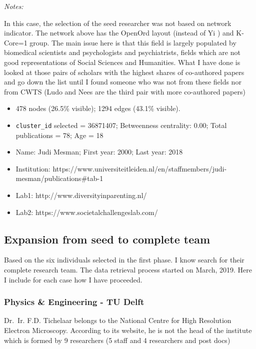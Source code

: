 \documentclass[]{elsarticle} %
\providecommand{\tightlist}{%
  \setlength{\itemsep}{0pt}\setlength{\parskip}{0pt}}
\begin{document}
\emph{Notes:}

In this case, the selection of the seed researcher was not based on
network indicator. The network above has the OpenOrd layout (instead of
Yi ) and K-Core=1 group. The main issue here is that this field is
largely populated by biomedical scientists and psychologists and
psychiatrists, fields which are not good representations of Social
Sciences and Humanities. What I have done is looked at those pairs of
scholars with the highest shares of co-authored papers and go down the
list until I found someone who was not from these fields nor from CWTS
(Ludo and Nees are the third pair with more co-authored papers)

\begin{itemize}
\tightlist
\item
  478 nodes (26.5\% visible); 1294 edges (43.1\% visible).
\item
  \texttt{cluster\_id} selected = 36871407; Betweenness centrality:
  0.00; Total publications = 78; Age = 18
\item
  Name: Judi Mesman; First year: 2000; Last year: 2018
\item
  Institution:
  https://www.universiteitleiden.nl/en/staffmembers/judi-mesman/publications\#tab-1
\item
  Lab1: http://www.diversityinparenting.nl/
\item
  Lab2: https://www.societalchallengeslab.com/
\end{itemize}

\hypertarget{expansion-from-seed-to-complete-team}{%
\subsection{Expansion from seed to complete
team}\label{expansion-from-seed-to-complete-team}}

Based on the six individuals selected in the first phase. I know search
for their complete research team. The data retrieval process started on
March, 2019. Here I include for each case how I have proceeded.

\hypertarget{physics-engineering---tu-delft}{%
\subsubsection{Physics \& Engineering - TU
Delft}\label{physics-engineering---tu-delft}}

Dr.~Ir. F.D. Tichelaar belongs to the National Centre for High
Resolution Electron Microscopy. According to its website, he is not the
head of the institute which is formed by 9 researchers (5 staff and 4
researchers and post docs)
\end{document}

